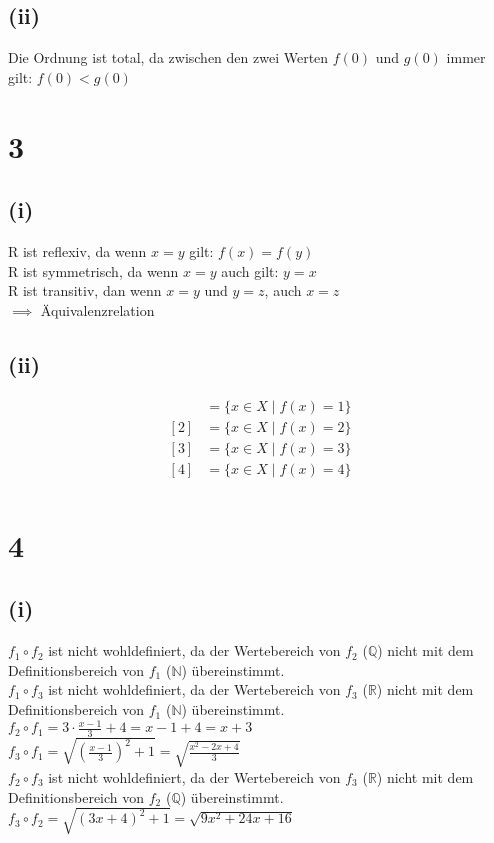 \documentclass{article}
\begin{document}
\subsection{(ii)}
Die Ordnung ist total, da zwischen den zwei Werten $f(0)$ und $g(0)$ immer gilt: $f(0) < g(0)$

\section{3}
\subsection{(i)}
R ist reflexiv, da wenn $x = y$ gilt: $f(x) = f(y)$ \\
R ist symmetrisch, da wenn $x = y$ auch gilt: $y = x$ \\
R ist transitiv, dan wenn $x = y$ und $y = z$, auch $x = z$ \\
$\implies$ Äquivalenzrelation
\subsection{(ii)}
\begin{align*}
    [1] &= \{ x \in X \mid f(x) = 1 \} \\
    [2] &= \{ x \in X \mid f(x) = 2 \} \\ 
    [3] &= \{ x \in X \mid f(x) = 3 \} \\ 
    [4] &= \{ x \in X \mid f(x) = 4 \} \\
\end{align*}

\section{4}
\subsection{(i)}
$f_1 \circ f_2$ ist nicht wohldefiniert, da der Wertebereich von $f_2$ ($\mathbb{Q}$) nicht mit dem Definitionsbereich von $f_1$ ($\mathbb{N}$) übereinstimmt. \\
\newline
$f_1 \circ f_3$ ist nicht wohldefiniert, da der Wertebereich von $f_3$ ($\mathbb{R}$) nicht mit dem Definitionsbereich von $f_1$ ($\mathbb{N}$) übereinstimmt. \\
\newline
$f_2 \circ f_1 = 3 \cdot \frac{x-1}{3} + 4 = x-1+4 = x+3$ \\
\newline
$f_3 \circ f_1 = \sqrt{(\frac{x-1}{3})^2 + 1} = \sqrt{\frac{x^2-2x+4}{3}}$ \\
\newline
$f_2 \circ f_3$ ist nicht wohldefiniert, da der Wertebereich von $f_3$ ($\mathbb{R}$) nicht mit dem Definitionsbereich von $f_2$ ($\mathbb{Q}$) übereinstimmt. \\
\newline
$f_3 \circ f_2 = \sqrt{(3x+4)^2+1} = \sqrt{9x^2+24x+16}$
\end{document}
